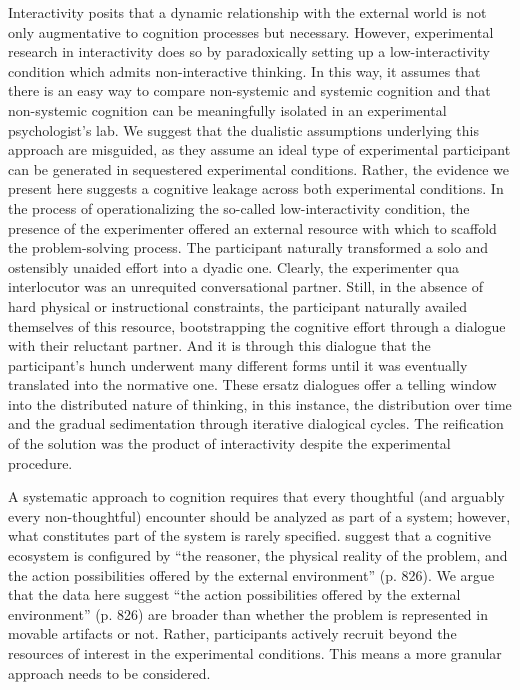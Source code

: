 \documentclass[twocolumn, serif, empirical, authordate]{jote-article}
\begin{document}
Interactivity posits that a dynamic relationship with the external world is not only augmentative to cognition processes but necessary. However, experimental research in interactivity does so by paradoxically setting up a low-interactivity condition which admits non-interactive thinking. In this way, it assumes that there is an easy way to compare non-systemic and systemic cognition and that non-systemic cognition can be meaningfully isolated in an experimental psychologist's lab. We suggest that the dualistic assumptions underlying this approach are misguided, as they assume an ideal type of experimental participant can be generated in sequestered experimental conditions. Rather, the evidence we present here suggests a cognitive leakage across both experimental conditions. In the process of operationalizing the so-called low-interactivity condition, the presence of the experimenter offered an external resource with which to scaffold the problem-solving process. The participant naturally transformed a solo and ostensibly unaided effort into a dyadic one. Clearly, the experimenter qua interlocutor was an unrequited conversational partner. Still, in the absence of hard physical or instructional constraints, the participant naturally availed themselves of this resource, bootstrapping the cognitive effort through a dialogue with their reluctant partner. And it is through this dialogue that the participant's hunch underwent many different forms until it was eventually translated into the normative one. These ersatz dialogues offer a telling window into the distributed nature of thinking, in this instance, the distribution over time and the gradual sedimentation through iterative dialogical cycles. The reification of the solution was the product of interactivity despite the experimental procedure. 

A systematic approach to cognition requires that every thoughtful (and arguably every non-thoughtful) encounter should be analyzed as part of a system; however, what constitutes part of the system is rarely specified. \textcite{Vallee-Tourangeau2020} suggest that a cognitive ecosystem is configured by ``the reasoner, the physical reality of the problem, and the action possibilities offered by the external environment'' (p. 826). We argue that the data here suggest ``the action possibilities offered by the external environment'' (p. 826) are broader than whether the problem is represented in movable artifacts or not. Rather, participants actively recruit beyond the resources of interest in the experimental conditions. This means a more granular approach needs to be considered. 
\end{document}
